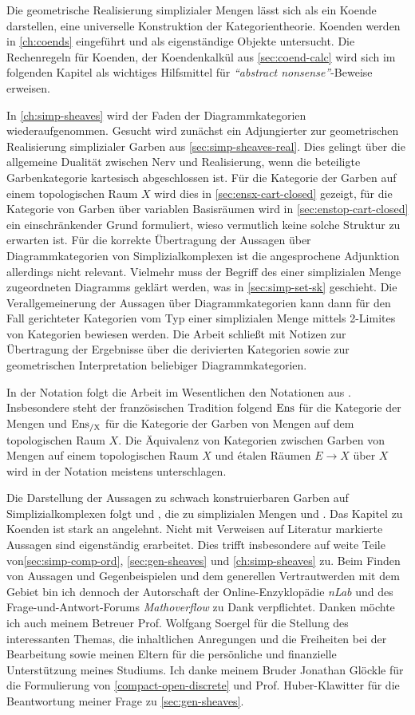 Die geometrische Realisierung simplizialer Mengen lässt sich als ein
Koende darstellen, eine universelle Konstruktion der
Kategorientheorie. Koenden werden in \autoref{ch:coends} eingeführt
und als eigenständige Objekte untersucht. Die Rechenregeln für
Koenden, der Koendenkalkül aus \autoref{sec:coend-calc} wird sich im
folgenden Kapitel als wichtiges Hilfsmittel für \emph{``abstract
  nonsense''}-Beweise erweisen.

In \autoref{ch:simp-sheaves} wird der Faden der Diagrammkategorien
wiederaufgenommen. Gesucht wird zunächst ein Adjungierter zur
geometrischen Realisierung simplizialer Garben aus
\autoref{sec:simp-sheaves-real}. Dies gelingt über die allgemeine
Dualität zwischen Nerv und Realisierung, wenn die beteiligte
Garbenkategorie kartesisch abgeschlossen ist.  Für die Kategorie der
Garben auf einem topologischen Raum $X$ wird dies in
\autoref{sec:ensx-cart-closed} gezeigt, für die Kategorie von Garben
über variablen Basisräumen wird in \autoref{sec:enstop-cart-closed}
ein einschränkender Grund formuliert, wieso vermutlich keine solche
Struktur zu erwarten ist. Für die korrekte Übertragung der Aussagen
über Diagrammkategorien von Simplizialkomplexen ist die angesprochene
Adjunktion allerdings nicht relevant. Vielmehr muss der Begriff des
einer simplizialen Menge zugeordneten Diagramms geklärt werden, was in
\autoref{sec:simp-set-sk} geschieht. Die Verallgemeinerung der
Aussagen über Diagrammkategorien kann dann für den Fall gerichteter
Kategorien vom Typ einer simplizialen Menge mittels 2-Limites von
Kategorien bewiesen werden. Die Arbeit schließt mit Notizen zur
Übertragung der Ergebnisse über die derivierten Kategorien sowie zur
geometrischen Interpretation beliebiger Diagrammkategorien.

In der Notation folgt die Arbeit im Wesentlichen den Notationen aus
\cite{TG}. Insbesondere steht der französischen Tradition folgend
$\operatorname{Ens}$ für die Kategorie der Mengen und $\operatorname{Ens_{/X}}$ für die Kategorie der
Garben von Mengen auf dem topologischen Raum $X$. Die Äquivalenz von
Kategorien zwischen Garben von Mengen auf einem topologischen Raum $X$
und étalen Räumen $E \to X$ über $X$ wird in der Notation meistens
unterschlagen.

Die Darstellung der Aussagen zu schwach konstruierbaren Garben auf
Simplizialkomplexen folgt \cite{KS} und \cite{WS}, die zu simplizialen
Mengen \cite{GJ} und \cite{GM}. Das Kapitel zu Koenden ist stark an
\cite{Lore} angelehnt. Nicht mit Verweisen auf Literatur markierte
Aussagen sind eigenständig erarbeitet. Dies trifft insbesondere auf
weite Teile von\autoref{sec:simp-comp-ord}, \autoref{sec:gen-sheaves}
und \autoref{ch:simp-sheaves} zu. Beim Finden von Aussagen und
Gegenbeispielen und dem generellen Vertrautwerden mit dem Gebiet bin
ich dennoch der Autorschaft der Online-Enzyklopädie \emph{nLab} und
des Frage-und-Antwort-Forums \emph{Mathoverflow} zu Dank
verpflichtet. Danken möchte ich auch meinem Betreuer Prof. Wolfgang
Soergel für die Stellung des interessanten Themas, die inhaltlichen
Anregungen und die Freiheiten bei der Bearbeitung sowie meinen Eltern
für die persönliche und finanzielle Unterstützung meines Studiums. Ich
danke meinem Bruder Jonathan Glöckle für die Formulierung von
\ref{compact-open-discrete} und Prof. Huber-Klawitter für die
Beantwortung meiner Frage zu \autoref{sec:gen-sheaves}.
